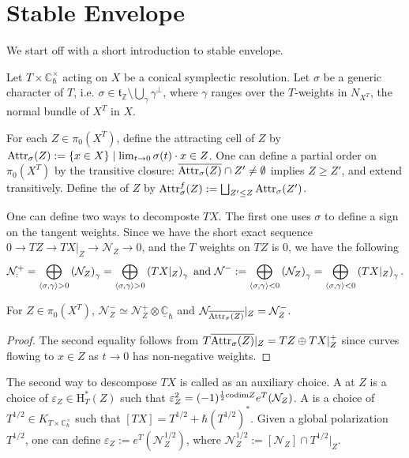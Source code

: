 \documentclass[b5paper]{article}
\newcommand{\NN}{\mathcal{N}}
\newcommand{\del}{\setminus}
\newcommand{\HH}{\mathrm{H}}
\newcommand{\Attr}{\textnormal{Attr}_\sigma}
\newcommand{\fAttr}{\textnormal{Attr}^f_\sigma}
\newcommand{\Chbar}{\mathbb{C}^\times _\hbar}
\begin{document}
\section{Stable Envelope}

We start off with a short introduction to stable envelope.

Let $T\times \Chbar$ acting on $X$ be a conical symplectic resolution. Let $\sigma$ be a generic character of $T$, i.e. $\sigma\in \mathfrak{t}_\mathbb{Z}\del\bigcup_\gamma\gamma^\perp $, where $\gamma$ ranges over the $T$-weights in $N_{X^T}$, the normal bundle of $X^T$ in $X$.

For each $Z\in \pi_0(X^T)$, define the attracting cell of $Z$ by $\Attr(Z):=\CB{x\in X}\mid \lim_{t\to 0}\sigma(t)\cdot x\in Z$.
One can define a partial order on $\pi_0(X^T)$ by the transitive closure: $\overline{\Attr(Z)}\cap Z'\neq \emptyset $ implies $Z\geq Z'$, and extend transitively.
Define the  of $Z$ by $\fAttr(Z):=\bigsqcup_{Z'\leq Z}\Attr(Z')$.

One can define two ways to decomposte $TX$. The first one uses $\sigma$ to define a sign on the tangent weights. Since we have the short exact sequence $0\rightarrow TZ\rightarrow TX|_Z\rightarrow \NN_Z\rightarrow 0$, and the $T$ weights on $TZ$ is $0$, we have the following
\[
    \NN^+_:=\bigoplus _{\AB{\sigma,\gamma}>0}\left(\NN_Z\right)_{\gamma}=\bigoplus _{\AB{\sigma,\gamma}>0}\left(TX|_{Z}\right)_{\gamma}
    \textnormal{ and }
    \NN^-:=\bigoplus _{\AB{\sigma,\gamma}<0}\left(\NN_Z\right)_{\gamma}=\bigoplus _{\AB{\sigma,\gamma}<0}\left(TX|_{Z}\right)_{\gamma}.
\]
\begin{proposition}{}
    For $Z\in \pi_0(X^T)$, $\NN^-_Z\simeq \NN^+_Z\otimes\underline{\mathbb{C}}_\hbar$ and $\NN_{\overline{\Attr(Z)}}|_{Z}=\NN^-_Z$.
    \begin{proof}
        The second equality follows from $T\overline{\Attr(Z)}|_Z=TZ\oplus TX|_Z^+$ since curves flowing to $x\in Z$ as $t\rightarrow 0$ has non-negative weights.
    \end{proof}
\end{proposition}

The second way to descompose $TX$ is called  as an auxiliary choice. A  at $Z$ is a choice of $\varepsilon_Z\in \HH^*_T(Z)$ such that $\varepsilon_Z^2=(-1)^{\frac{1}{2}\codim Z}e^T(\NN_Z)$. A  is a choice of $T^{1/2}\in K_{T\times \Chbar}$ such that $[TX]=T^{1/2}+\hbar(T^{1/2})^*$.
Given a global polarization $T^{1/2}$, one can define $\varepsilon_Z:=e^T(\NN_{Z}^{1/2})$, where $\NN_Z^{1/2}:=[\NN_Z]\cap T^{1/2}|_{Z}$.
\end{document}
